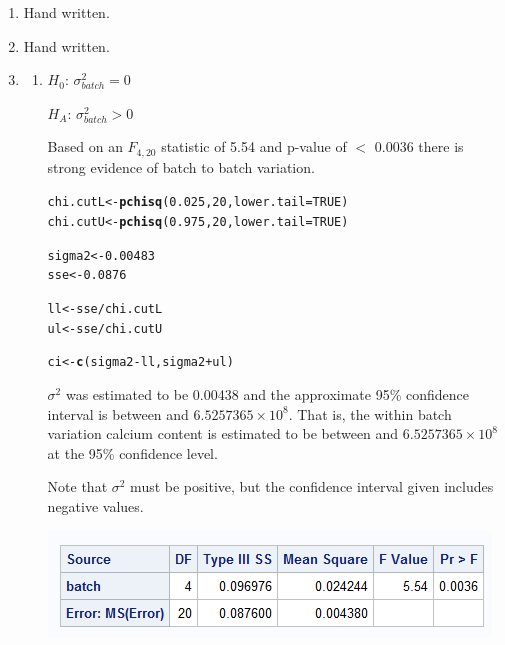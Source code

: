 \documentclass{article}\usepackage[]{graphicx}\usepackage[]{color}
\makeatletter
\newcommand{\hlnum}[1]{\textcolor[rgb]{0.686,0.059,0.569}{#1}}%
\newcommand{\hlopt}[1]{\textcolor[rgb]{0,0,0}{#1}}%
\newcommand{\hlstd}[1]{\textcolor[rgb]{0.345,0.345,0.345}{#1}}%
\newcommand{\hlkwb}[1]{\textcolor[rgb]{0.69,0.353,0.396}{#1}}%
\newcommand{\hlkwc}[1]{\textcolor[rgb]{0.333,0.667,0.333}{#1}}%
\newcommand{\hlkwd}[1]{\textcolor[rgb]{0.737,0.353,0.396}{\textbf{#1}}}%
\newenvironment{kframe}{%
 \def\at@end@of@kframe{}%
 \ifinner\ifhmode%
  \def\at@end@of@kframe{\end{minipage}}%
  \begin{minipage}{\columnwidth}%
 \fi\fi%
 \def\FrameCommand##1{\hskip\@totalleftmargin \hskip-\fboxsep
 \colorbox{shadecolor}{##1}\hskip-\fboxsep
     \hskip-\linewidth \hskip-\@totalleftmargin \hskip\columnwidth}%
 \MakeFramed {\advance\hsize-\width
   \@totalleftmargin\z@ \linewidth\hsize
   \@setminipage}}%
 {\par\unskip\endMakeFramed%
 \at@end@of@kframe}
\newenvironment{knitrout}{}{} %
\makeatother
\begin{document}
\begin{enumerate}
        
\item %

Hand written.

\item %

Hand written.

\item %
\begin{enumerate}
\item %

$H_{0}$: $\sigma^{2}_{batch} = 0$

$H_{A}$: $\sigma^{2}_{batch} > 0$

Based on an $F_{4,20}$ statistic of 5.54 and p-value of $<$ 0.0036 there is strong evidence of batch to batch variation.

\begin{knitrout}\footnotesize
{}\color{fgcolor}\begin{kframe}
\begin{alltt}
\hlstd{chi.cutL} \hlkwb{<-} \hlkwd{pchisq}\hlstd{(}\hlnum{0.025}\hlstd{,}\hlnum{20}\hlstd{,} \hlkwc{lower.tail} \hlstd{=} \hlnum{TRUE}\hlstd{)}
\hlstd{chi.cutU} \hlkwb{<-} \hlkwd{pchisq}\hlstd{(}\hlnum{0.975}\hlstd{,}\hlnum{20}\hlstd{,} \hlkwc{lower.tail} \hlstd{=} \hlnum{TRUE}\hlstd{)}

\hlstd{sigma2} \hlkwb{<-} \hlnum{0.00483}
\hlstd{sse} \hlkwb{<-} \hlnum{0.0876}

\hlstd{ll} \hlkwb{<-} \hlstd{sse}\hlopt{/}\hlstd{chi.cutL}
\hlstd{ul} \hlkwb{<-} \hlstd{sse}\hlopt{/}\hlstd{chi.cutU}

\hlstd{ci} \hlkwb{<-} \hlkwd{c}\hlstd{(sigma2}\hlopt{-}\hlstd{ll,sigma2}\hlopt{+}\hlstd{ul)}
\end{alltt}
\end{kframe}
\end{knitrout}

$\sigma^{2}$ was estimated to be 0.00438 and the approximate 95\% confidence interval is between  and \ensuremath{6.5257365\times 10^{8}}. That is, the within batch variation calcium content is estimated to be between  and \ensuremath{6.5257365\times 10^{8}} at the 95\% confidence level. 

Note that $\sigma^{2}$ must be positive, but the confidence interval given includes negative values.

\includegraphics{prob3tb}




\end{enumerate}
\end{enumerate}
\end{document}
